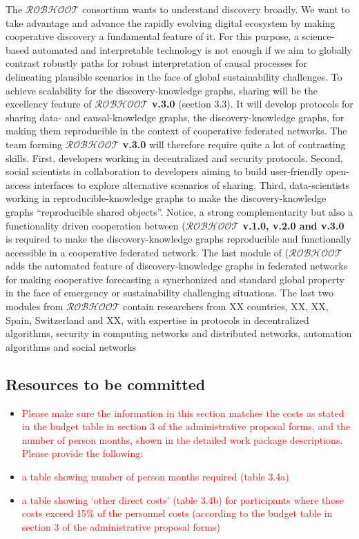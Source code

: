 \documentclass[11pt, a4paper]{article} %
\begin{document}
  The {\bf $\mathcal{ROBHOOT}$} consortium wants to understand
  discovery broadly. We want to take advantage and advance the rapidly
  evolving digital ecosystem by making cooperative discovery a
  fundamental feature of it. For this purpose, a science-based
  automated and interpretable technology is not enough if we aim to
  globally contrast robustly paths for robust interpretation of causal
  processes for delineating plausible scenarios in the face of global
  sustainability challenges. To achieve scalability for the
  discovery-knowledge graphs, sharing will be the excellency feature
  of {\bf $\mathcal{ROBHOOT}$ v.3.0} (section 3.3). It will develop
  protocols for sharing data- and causal-knowledge graphs, the
  discovery-knowledge graphs, for making them reproducible in the
  context of cooperative federated networks. The team forming {\bf
    $\mathcal{ROBHOOT}$ v.3.0} will therefore require quite a lot of
  contrasting skills. First, developers working in decentralized and
  security protocols. Second, social scientists in collaboration to
  developers aiming to build user-friendly open-access interfaces to
  explore alternative scenarios of sharing. Third, data-scientists
  working in reproducible-knowledge graphs to make the
  discovery-knowledge graphs ``reproducible shared objects''. Notice,
  a strong complementarity but also a functionality driven cooperation
  between ({\bf $\mathcal{ROBHOOT}$ v.1.0, v.2.0 and v.3.0} is
  required to make the discovery-knowledge graphs reproducible and
  functionally accessible in a cooperative federated network. The last
  module of ({\bf $\mathcal{ROBHOOT}$} adds the automated feature of
  discovery-knowledge graphs in federated networks for making
  cooperative forecasting a syncrhonized and standard global property
  in the face of emergency or sustainability challenging
  situations. The last two modules from {\bf $\mathcal{ROBHOOT}$}
  contain researchers from XX countries, XX, XX, Spain, Switzerland
  and XX, with expertise in protocols in decentralized algorithms,
  security in computing networks and distributed networks, automation
  algorithms and social networks

  \subsection{Resources to be committed}
 
  \begin{itemize}
  \item \textcolor{red}{Please make sure the information in this
      section matches the costs as stated in the budget table in
      section 3 of the administrative proposal forms, and the number
      of person months, shown in the detailed work package
      descriptions.  Please provide the following:}
 \item \textcolor{red}{a table showing number of person months required
    (table 3.4a)}
  \item \textcolor{red}{a table showing ‘other direct costs’ (table
      3.4b) for participants where those costs exceed 15\% of the
      personnel costs (according to the budget table in section 3 of
      the administrative proposal forms)}
\end{itemize}
\end{document}
